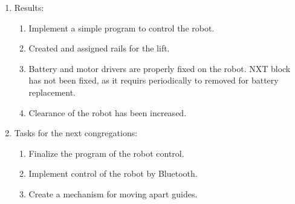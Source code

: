 \begin{enumerate}
\begin{enumerate}
    \end{enumerate}
    
	\item Results:  
	\begin{enumerate}
	  \item  Implement a simple program to control the robot.
	  
      \item  Created and assigned rails for the lift.
      
      \item  Battery and motor drivers are properly fixed on the robot. NXT block has not been fixed, as it requirs periodically to removed for battery replacement.
      
      \item  Clearance of the robot has been increased.
      
    \end{enumerate}
    
	\item Tasks for the next congregations:
	\begin{enumerate}
	  \item Finalize the program of the robot control.
	  
	  \item Implement control of the robot by Bluetooth.
	  
	  \item Create a mechanism for moving apart guides.
	  
    \end{enumerate}     
\end{enumerate}
\fillpage
